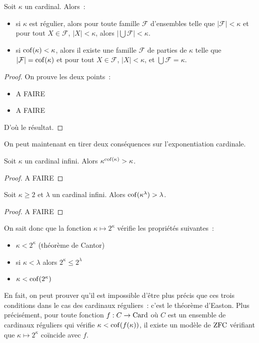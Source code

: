 \begin{theorem}[König]
  Soit $\kappa$ un cardinal. Alors~:
  \begin{itemize}
  \item si $\kappa$ est régulier, alors pour toute famille $\mathcal F$
    d'ensembles telle que $|\mathcal F| < \kappa$ et pour tout $X\in\mathcal F$,
    $|X| < \kappa$, alors $\displaystyle\Big|\bigcup \mathcal F\Big| < \kappa$.
  \item si $\operatorname{cof}(\kappa) < \kappa$, alors il existe une famille $\mathcal F$
    de parties de $\kappa$ telle que $|\mathcal F| = \operatorname{cof}(\kappa)$ et pour tout
    $X\in\mathcal F$, $|X|<\kappa$, et $\displaystyle\bigcup\mathcal F =\kappa$.
  \end{itemize}
\end{theorem}

\begin{proof}
  On prouve les deux points~:
  \begin{itemize}
  \item A FAIRE
  \item A FAIRE
  \end{itemize}
  D'où le résultat.
\end{proof}

On peut maintenant en tirer deux conséquences sur l'exponentiation cardinale.

\begin{proposition}
  Soit $\kappa$ un cardinal infini. Alors $\kappa^{\operatorname{cof}(\kappa)} > \kappa$.
\end{proposition}

\begin{proof}
  A FAIRE
\end{proof}

\begin{theorem}
  Soit $\kappa \geq 2$ et $\lambda$ un cardinal infini. Alors
  $\operatorname{cof}(\kappa^\lambda) > \lambda$.
\end{theorem}

\begin{proof}
  A FAIRE
\end{proof}

On sait donc que la fonction $\kappa \mapsto 2^\kappa$ vérifie les propriétés
suivantes~:
\begin{itemize}
\item $\kappa < 2^\kappa$ (théorème de Cantor)
\item si $\kappa < \lambda$ alors $2^\kappa \leq 2^\lambda$
\item $\kappa < \operatorname{cof}(2^\kappa)$
\end{itemize}

En fait, on peut prouver qu'il est impossible d'être plus précis que ces trois
conditions dans le cas des cardinaux réguliers~: c'est le théorème d'Easton.
Plus précisément, pour toute fonction $f : C \to \operatorname{Card}$ où $C$ est un ensemble
de cardinaux réguliers qui vérifie $\kappa < \operatorname{cof}(f(\kappa))$, il existe un
modèle de $\operatorname{ZFC}$ vérifiant que $\kappa \mapsto 2^\kappa$ coïncide avec $f$.

